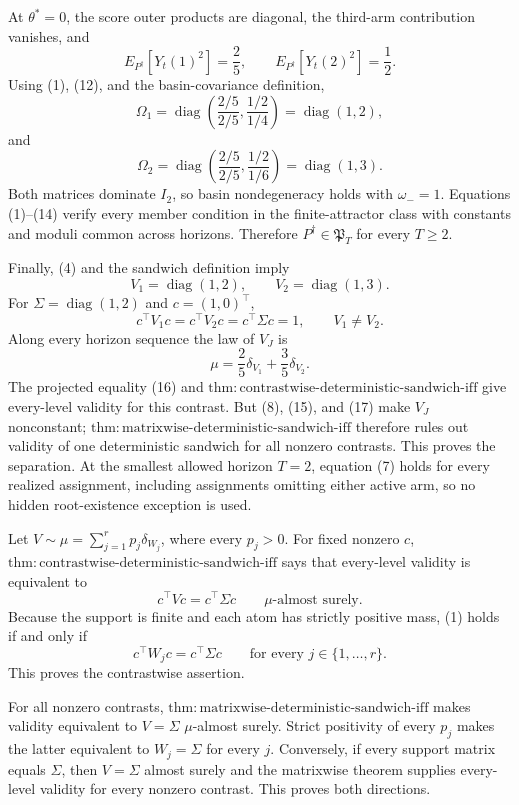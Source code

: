 At \(\theta^*=0\), the score outer products are diagonal, the third-arm contribution vanishes, and
\[
 E_{P^{\dagger}}[Y_t(1)^2]=\frac25,
 \qquad E_{P^{\dagger}}[Y_t(2)^2]=\frac12.
\tag{12}
\]
Using (1), (12), and the basin-covariance definition,
\[
 \Omega_1=\operatorname{diag}\left(\frac{2/5}{2/5},\frac{1/2}{1/4}\right)
 =\operatorname{diag}(1,2),
\tag{13}
\]
and
\[
 \Omega_2=\operatorname{diag}\left(\frac{2/5}{2/5},\frac{1/2}{1/6}\right)
 =\operatorname{diag}(1,3).
\tag{14}
\]
Both matrices dominate \(I_2\), so basin nondegeneracy holds with \(\omega_-=1\). Equations (1)--(14) verify every member condition in the finite-attractor class with constants and moduli common across horizons. Therefore \(P^{\dagger}\in\mathfrak P_T\) for every \(T\ge2\).

Finally, (4) and the sandwich definition imply
\[
 V_1=\operatorname{diag}(1,2),
 \qquad V_2=\operatorname{diag}(1,3).
\tag{15}
\]
For \(\Sigma=\operatorname{diag}(1,2)\) and \(c=(1,0)^\top\),
\[
 c^\top V_1c=c^\top V_2c=c^\top\Sigma c=1,
 \qquad V_1\ne V_2.
\tag{16}
\]
Along every horizon sequence the law of \(V_J\) is
\[
 \mu=\frac25\delta_{V_1}+\frac35\delta_{V_2}.
\tag{17}
\]
The projected equality (16) and \(\mathrm{thm:contrastwise\text{-}deterministic\text{-}sandwich\text{-}iff}\) give every-level validity for this contrast. But (8), (15), and (17) make \(V_J\) nonconstant; \(\mathrm{thm:matrixwise\text{-}deterministic\text{-}sandwich\text{-}iff}\) therefore rules out validity of one deterministic sandwich for all nonzero contrasts. This proves the separation. At the smallest allowed horizon \(T=2\), equation (7) holds for every realized assignment, including assignments omitting either active arm, so no hidden root-existence exception is used.

Let \(V\sim\mu=\sum_{j=1}^r p_j\delta_{W_j}\), where every \(p_j>0\). For fixed nonzero \(c\), \(\mathrm{thm:contrastwise\text{-}deterministic\text{-}sandwich\text{-}iff}\) says that every-level validity is equivalent to
\[
 c^\top Vc=c^\top\Sigma c\qquad\mu\text{-almost surely}.
\tag{1}
\]
Because the support is finite and each atom has strictly positive mass, (1) holds if and only if
\[
 c^\top W_jc=c^\top\Sigma c
 \qquad\text{for every }j\in\{1,\ldots,r\}.
\tag{2}
\]
This proves the contrastwise assertion.

For all nonzero contrasts, \(\mathrm{thm:matrixwise\text{-}deterministic\text{-}sandwich\text{-}iff}\) makes validity equivalent to \(V=\Sigma\) \(\mu\)-almost surely. Strict positivity of every \(p_j\) makes the latter equivalent to \(W_j=\Sigma\) for every \(j\). Conversely, if every support matrix equals \(\Sigma\), then \(V=\Sigma\) almost surely and the matrixwise theorem supplies every-level validity for every nonzero contrast. This proves both directions.
